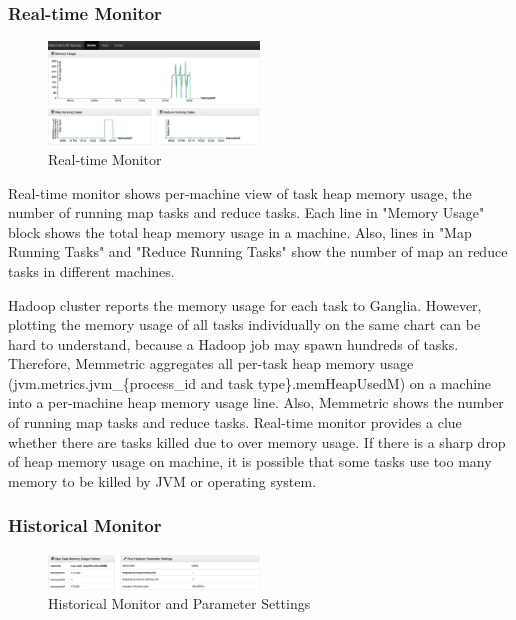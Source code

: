 \subsubsection{Real-time Monitor}

\begin{figure}[h!]
  \centering
    \includegraphics[width=0.5\textwidth]{image/real-time-monitor.png}
  \caption{Real-time Monitor}
\end{figure}

Real-time monitor shows per-machine view of task heap memory usage, the number of running map tasks and reduce tasks. Each line in "Memory Usage" block shows the total heap memory usage in a machine. Also, lines in "Map Running Tasks" and "Reduce Running Tasks" show the number of map an reduce tasks in different machines.

Hadoop cluster reports the memory usage for each task to Ganglia. However, plotting the memory usage of all tasks individually on the same chart can be hard to understand, because a Hadoop job may spawn hundreds of tasks. Therefore, Memmetric aggregates all per-task heap memory usage (jvm.metrics.jvm\_\{process\_id and task type\}.memHeapUsedM) on a machine into a per-machine heap memory usage line. Also, Memmetric shows the number of running map tasks and reduce tasks. Real-time monitor provides a clue whether there are tasks killed due to over memory usage. If there is a sharp drop of heap memory usage on machine, it is possible that some tasks use too many memory to be killed by JVM or operating system. 

\subsubsection{Historical Monitor}

\begin{figure}[h!]
  \centering
    \includegraphics[width=0.5\textwidth]{image/historical-monitor.png}
  \caption{Historical Monitor and Parameter Settings}
\end{figure}

